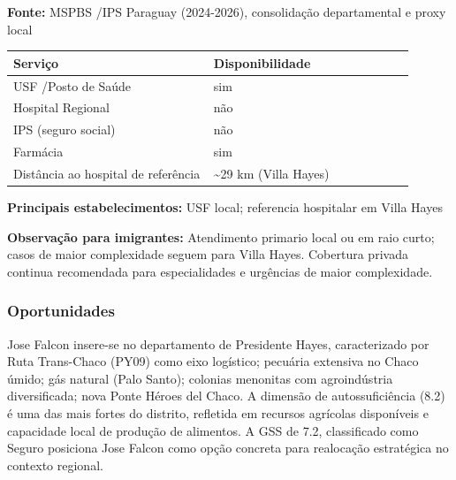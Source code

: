 \textbf{Fonte:} MSPBS /\allowbreak  IPS Paraguay (2024-2026), consolidação
departamental e proxy local

{\def\LTcaptype{none} %
\begin{longtable}{@{}>{\raggedright\arraybackslash}p{0.45\linewidth} >{\raggedright\arraybackslash}p{0.45\linewidth}@{}}
\toprule\noalign{}
Serviço & Disponibilidade \\
\midrule\noalign{}
\endhead
\bottomrule\noalign{}
\endlastfoot
USF /\allowbreak  Posto de Saúde & sim \\
Hospital Regional & não \\
IPS (seguro social) & não \\
Farmácia & sim \\
Distância ao hospital de referência & \textasciitilde29 km (Villa
Hayes) \\
\end{longtable}
}

\textbf{Principais estabelecimentos:} USF local; referencia hospitalar
em Villa Hayes

\textbf{Observação para imigrantes:} Atendimento primario local ou em
raio curto; casos de maior complexidade seguem para Villa Hayes.
Cobertura privada continua recomendada para especialidades e urgências
de maior complexidade.
\newpage

\subsubsection*{Oportunidades}\label{oport-jose-falcon-1506}
Jose Falcon insere-se no departamento de Presidente Hayes, caracterizado por Ruta Trans-Chaco (PY09) como eixo logístico; pecuária extensiva no Chaco úmido; gás natural (Palo Santo); colonias menonitas com agroindústria diversificada; nova Ponte Héroes del Chaco. A dimensão de autossuficiência (8.2) é uma das mais fortes do distrito, refletida em recursos agrícolas disponíveis e capacidade local de produção de alimentos. A GSS de 7.2, classificado como Seguro posiciona Jose Falcon como opção concreta para realocação estratégica no contexto regional.

